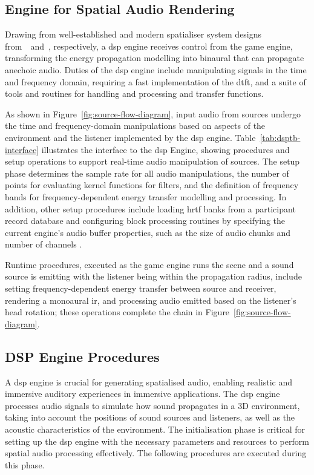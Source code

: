 \subsection{Engine for Spatial Audio Rendering}

Drawing from well-established and modern spatialiser system designs from~\cite{naef2002spatialized}~and~\cite{lakka2021x3d}, respectively, a \acrshort{dsp} engine receives control from the game engine, transforming the energy propagation modelling into binaural  that can propagate anechoic audio. Duties of the \acrshort{dsp} engine include manipulating signals in the time and frequency domain, requiring a fast implementation of the \acrshort{dtft}, and a suite of tools and routines for handling and processing  and transfer functions.\par
As shown in Figure~\ref{fig:source-flow-diagram}, input audio from sources undergo the time and frequency-domain manipulations based on aspects of the environment and the listener implemented by the \acrshort{dsp} engine. Table~\ref{tab:dsptb-interface} illustrates the interface to the \acrshort{dsp} Engine, showing procedures and setup operations to support real-time audio manipulation of sources. The setup phase determines the sample rate for all audio manipulations, the number of points for evaluating kernel functions for filters, and the definition of frequency bands for frequency-dependent energy transfer modelling and processing. In addition, other setup procedures include loading \acrshort{hrtf} banks from a participant record database and configuring block processing routines by specifying the current engine's audio buffer properties, such as the size of audio chunks and number of channels \citep{hoene2017mysofa}.\par
Runtime procedures, executed as the game engine runs the scene and a sound source is emitting with the listener being within the propagation radius, include setting frequency-dependent energy transfer between source and receiver, rendering a monoaural \acrshort{ir}, and processing audio emitted based on the listener's head rotation; these operations complete the chain in Figure~\ref{fig:source-flow-diagram}.\par

\subsection{DSP Engine Procedures}
A \acrfull{dsp} engine is crucial for generating spatialised audio, enabling realistic and immersive auditory experiences in immersive applications. The \acrshort{dsp} engine processes audio signals to simulate how sound propagates in a 3D environment, taking into account the positions of sound sources and listeners, as well as the acoustic characteristics of the environment. The initialisation phase is critical for setting up the \acrshort{dsp} engine with the necessary parameters and resources to perform spatial audio processing effectively. The following procedures are executed during this phase.\par


